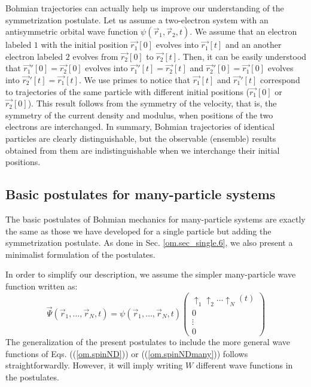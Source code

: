 \documentclass[onecolumn,nofootinbib, secnumarabic, amsmath, nobibnotes,12pt,aps,pra]{revtex4-1}
\newcommand{\pref}[1]{(\ref{#1})}
\newcommand{\sref}[1]{Sec. \ref{#1}}
\begin{document}
Bohmian trajectories can actually help us improve our understanding of the symmetrization postulate. Let us assume a two-electron system with an antisymmetric orbital wave function $\psi(\vec r_1,\vec r_2,t)$. We assume that an electron labeled $1$ with the initial position $\vec {r_1}[0]$ evolves into $\vec {r_1}[t]$ and an another electron labeled $2$ evolves from $\vec {r_2}[0]$ to $\vec {r_2}[t]$. Then, it can be easily understood that $\vec {r_1}'[0] = \vec {r_2}[0]$ evolves into $\vec {r_1}'[t] = \vec {r_2}[t]$ and $\vec {r_2}'[0] = \vec {r_1}[0]$ evolves into $\vec {r_2}'[t] = \vec {r_1}[t]$. We use primes to notice that $\vec {r_1}[t]$ and $\vec {r_1}'[t]$ correspond to trajectories of the same particle with different initial positions ($\vec {r_1}[0]$ or $\vec {r_2}[0]$).
This result follows from the symmetry of the velocity, that is, the symmetry of the current density and modulus, when positions of the two electrons are interchanged. In summary, Bohmian trajectories of identical particles are clearly distinguishable, but the observable (ensemble) results obtained from them are indistinguishable when we interchange their initial positions.

\subsection{Basic postulates  for many-particle systems}\label{om.sec_many.5}

The basic postulates of Bohmian mechanics for many-particle systems are exactly the same as those we have developed for a single particle but adding the symmetrization postulate. As done in \sref{om.sec_single.6}, we also present a minimalist formulation of the postulates.

\enlargethispage{-1pc}
In order to simplify our description, we assume the simpler many-particle wave function written as:
\begin{equation}
\label{om.wavepostulate}
\vec \Psi(\vec r_1,\ldots,\vec r_N,t) = \psi(\vec r_1,\ldots,\vec r_N,t)\left(
\begin{array}{c}
\uparrow_1 \uparrow_2\ldots\uparrow_N(t) \\ 0 \\ \vdots \\ 0
\end{array}
\right)
\end{equation}
The generalization of the present postulates to include the more general wave functions of Eqs. (\pref{om.spinND}) or (\pref{om.spinNDmany}) follows straightforwardly. However, it will imply writing $W$ different wave functions in the postulates.\\
\end{document}
